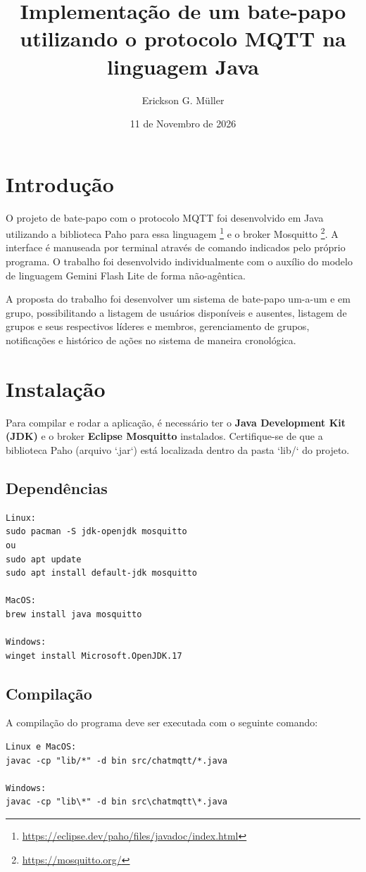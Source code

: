 \documentclass{report}
\title{Implementação de um bate-papo utilizando o protocolo MQTT na linguagem Java}
\author{Erickson G. Müller}
\date{11 de Novembro de 2026}
\begin{document}
\maketitle

\chapter{Introdução}

O projeto de bate-papo com o protocolo MQTT foi desenvolvido em Java utilizando a biblioteca Paho para essa linguagem \footnote{\url{https://eclipse.dev/paho/files/javadoc/index.html}} e o broker Mosquitto \footnote{\url{https://mosquitto.org/}}. A interface é manuseada por terminal através de comando indicados pelo próprio programa. O trabalho foi desenvolvido individualmente com o auxílio do modelo de linguagem Gemini Flash Lite de forma não-agêntica.

A proposta do trabalho foi desenvolver um sistema de bate-papo um-a-um e em grupo, possibilitando a listagem de usuários disponíveis e ausentes, listagem de grupos e seus respectivos líderes e membros, gerenciamento de grupos, notificações e histórico de ações no sistema de maneira cronológica.

\chapter{Instalação}
Para compilar e rodar a aplicação, é necessário ter o \textbf{Java Development Kit (JDK)} e o broker \textbf{Eclipse Mosquitto} instalados. Certifique-se de que a biblioteca Paho (arquivo `.jar`) está localizada dentro da pasta `lib/` do projeto.

\section{Dependências}
\begin{verbatim}
Linux:
sudo pacman -S jdk-openjdk mosquitto
ou
sudo apt update
sudo apt install default-jdk mosquitto

MacOS:
brew install java mosquitto

Windows:
winget install Microsoft.OpenJDK.17
\end{verbatim}

\section{Compilação}
A compilação do programa deve ser executada com o seguinte comando:
\begin{verbatim}
Linux e MacOS:
javac -cp "lib/*" -d bin src/chatmqtt/*.java

Windows:
javac -cp "lib\*" -d bin src\chatmqtt\*.java
\end{verbatim}
\end{document}
